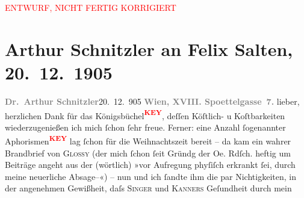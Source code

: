 
\begin{center}
            \textcolor{red}{ENTWURF, NICHT FERTIG KORRIGIERT}
                      \end{center}
            
         
         \renewcommand{\erwaehntePersonen}{Personen: Karl Glossy, Heinrich Kanner, Felix Salten, Isidor Singer, Jakob Wassermann}
         \renewcommand{\erwaehnteInstitutionen}{Institutionen: Österreichische Rundschau}
         \renewcommand{\erwaehnteOrte}{Orte: Riedhof, Semmering, Theater in der Josefstadt, Wien}
         \renewcommand{\erwaehnteWerke}{}
               \section[Arthur Schnitzler an Felix Salten, 20. 12. 1905]{ Arthur Schnitzler an Felix Salten, 20. 12. 1905}\nopagebreak{}\rehead{ }\begin{ledgroupsized}[t]{13cm}\normalsize\beginnumbering \toendnotes[C]{\smallbreak\pagebreak[2]} 
\toendnotes[C]{\smallbreak}\pstart
           \noindent{}{\pb}\textcolor{gray}{\textbf{Dr. Arthur Schnitzler}}\hfill 20. 12. 905\pend
           \pstart
           \textcolor{gray}{\textbf{Wien, XVIII.
                        Spoettelgasse 7.}}\pend
           \pstart
           lieber, herzlichen Dank für das Königsbüchel\textcolor{red}{\textsuperscript{\textbf{KEY}}}, deſſen Köſtlich- u Koſtbarkeiten wiederzugenießen ich mich
               ſchon ſehr freue. \pend
           \pstart
           Ferner: eine Anzahl ſogenannter Aphorismen\textcolor{red}{\textsuperscript{\textbf{KEY}}} lag ſchon für
               die Weihnachtszeit bereit – da kam ein wahrer Brandbrief von \textsc{Glossy} (der mich ſchon ſeit Gründg der Oe. Rdſch.
               heftig um Beiträge angeht aus der (wörtlich) »vor Aufregung phyſiſch {\pb}erkrankt ſei, durch meine neuerliche
               Absage–«) – nun und ich ſandte ihm die par Nichtigkeiten, in der angenehmen
               Gewißheit, daſs \textsc{Singer} und \textsc{Kanners } Geſundheit durch mein

\end{ledgroupsized}

